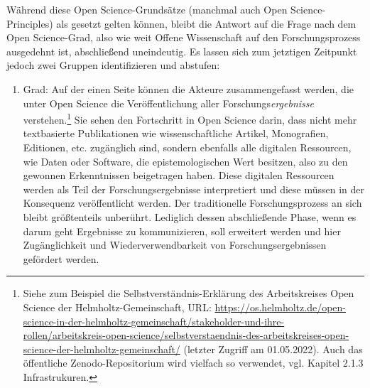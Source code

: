 Während diese Open Science-Grundsätze (manchmal auch Open Science-Principles) als gesetzt gelten können, bleibt die Antwort auf die Frage nach dem Open Science-Grad, also wie weit Offene Wissenschaft auf den Forschungsprozess ausgedehnt ist, abschließend uneindeutig. Es lassen sich zum jetztigen Zeitpunkt jedoch zwei Gruppen identifizieren und abstufen:
\begin{enumerate}
\item Grad: Auf der einen Seite können die Akteure zusammengefasst werden, die unter Open Science die Veröffentlichung aller Forschungs\textit{ergebnisse} verstehen.\footnote{Siehe zum Beispiel die Selbstverständnis-Erklärung des Arbeitskreises Open Science der Helmholtz-Gemeinschaft, URL: \url{https://os.helmholtz.de/open-science-in-der-helmholtz-gemeinschaft/stakeholder-und-ihre-rollen/arbeitskreis-open-science/selbstverstaendnis-des-arbeitskreises-open-science-der-helmholtz-gemeinschaft/} (letzter Zugriff am 01.05.2022). Auch das öffentliche Zenodo-Repositorium wird vielfach so verwendet, vgl. Kapitel 2.1.3 Infrastrukuren.} Sie sehen den Fortschritt in Open Science darin, dass nicht mehr textbasierte Publikationen wie wissenschaftliche Artikel, Monografien, Editionen, etc. zugänglich sind, sondern ebenfalls alle digitalen Ressourcen, wie Daten oder Software, die epistemologischen Wert besitzen, also zu den gewonnen Erkenntnissen beigetragen haben. Diese digitalen Ressourcen werden als Teil der Forschungsergebnisse interpretiert und diese müssen in der Konsequenz veröffentlicht werden. Der traditionelle Forschungsprozess an sich bleibt größtenteils unberührt. Lediglich dessen abschließende Phase, wenn es darum geht Ergebnisse zu kommunizieren, soll erweitert werden und hier Zugänglichkeit und Wiederverwendbarkeit von Forschungsergebnissen gefördert werden.

\end{enumerate}
